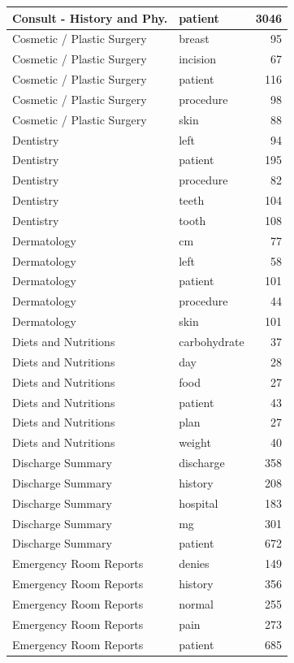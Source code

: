 \documentclass[
]{article}
\begin{document}
\begin{table}
\begin{tabular}{l|l|r}
\hline
Consult - History and Phy. & patient & 3046\\
\hline
Cosmetic / Plastic Surgery & breast & 95\\
\hline
Cosmetic / Plastic Surgery & incision & 67\\
\hline
Cosmetic / Plastic Surgery & patient & 116\\
\hline
Cosmetic / Plastic Surgery & procedure & 98\\
\hline
Cosmetic / Plastic Surgery & skin & 88\\
\hline
Dentistry & left & 94\\
\hline
Dentistry & patient & 195\\
\hline
Dentistry & procedure & 82\\
\hline
Dentistry & teeth & 104\\
\hline
Dentistry & tooth & 108\\
\hline
Dermatology & cm & 77\\
\hline
Dermatology & left & 58\\
\hline
Dermatology & patient & 101\\
\hline
Dermatology & procedure & 44\\
\hline
Dermatology & skin & 101\\
\hline
Diets and Nutritions & carbohydrate & 37\\
\hline
Diets and Nutritions & day & 28\\
\hline
Diets and Nutritions & food & 27\\
\hline
Diets and Nutritions & patient & 43\\
\hline
Diets and Nutritions & plan & 27\\
\hline
Diets and Nutritions & weight & 40\\
\hline
Discharge Summary & discharge & 358\\
\hline
Discharge Summary & history & 208\\
\hline
Discharge Summary & hospital & 183\\
\hline
Discharge Summary & mg & 301\\
\hline
Discharge Summary & patient & 672\\
\hline
Emergency Room Reports & denies & 149\\
\hline
Emergency Room Reports & history & 356\\
\hline
Emergency Room Reports & normal & 255\\
\hline
Emergency Room Reports & pain & 273\\
\hline
Emergency Room Reports & patient & 685\\

\end{tabular}
\end{table}
\end{document}
